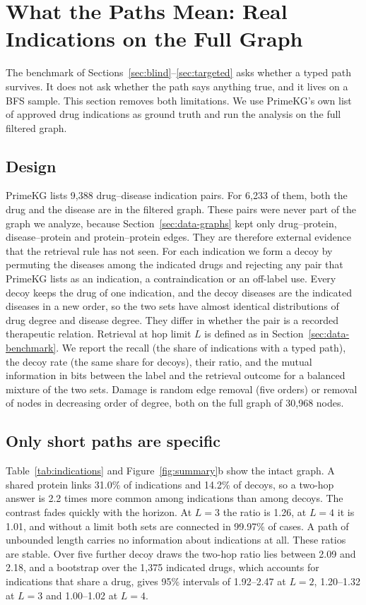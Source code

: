 \section{What the Paths Mean: Real Indications on the Full Graph}
\label{sec:indications}

The benchmark of Sections~\ref{sec:blind}--\ref{sec:targeted} asks whether a
typed path survives. It does not ask whether the path says anything true, and
it lives on a BFS sample. This section removes both limitations. We use
PrimeKG's own list of approved drug indications as ground truth and run the
analysis on the full filtered graph.

\subsection{Design}
\label{sec:indications-design}

PrimeKG lists 9,388 drug--disease indication pairs. For 6,233 of them, both the
drug and the disease are in the filtered graph. These pairs were never part of
the graph we analyze, because Section~\ref{sec:data-graphs} kept only
drug--protein, disease--protein and protein--protein edges. They are therefore
external evidence that the retrieval rule has not seen. For each indication we
form a decoy by permuting the diseases among the indicated drugs and rejecting
any pair that PrimeKG lists as an indication, a contraindication or an
off-label use. Every decoy keeps the drug of one indication, and the decoy diseases
are the indicated diseases in a new order, so the two sets have almost
identical distributions of drug degree and disease degree. They differ in
whether the pair is a recorded therapeutic relation. Retrieval at hop limit $L$ is defined as in
Section~\ref{sec:data-benchmark}. We report the recall (the share of
indications with a typed path), the decoy rate (the same share for decoys),
their ratio, and the mutual information in bits between the label and the
retrieval outcome for a balanced mixture of the two sets. Damage is random edge
removal (five orders) or removal of nodes in decreasing order of degree, both on
the full graph of 30,968 nodes.

\subsection{Only short paths are specific}
\label{sec:indications-specific}

Table~\ref{tab:indications} and Figure~\ref{fig:summary}b show the intact
graph. A shared protein links 31.0\% of indications and 14.2\% of decoys, so a
two-hop answer is 2.2 times more common among indications than among decoys. The
contrast fades quickly with the horizon. At $L=3$ the ratio is 1.26, at $L=4$
it is 1.01, and without a limit both sets are connected in 99.97\% of cases. A
path of unbounded length carries no information about indications at all. These
ratios are stable. Over five further decoy draws the two-hop ratio lies between
2.09 and 2.18, and a bootstrap over the 1,375 indicated drugs, which accounts for
indications that share a drug, gives 95\% intervals of 1.92--2.47 at $L=2$,
1.20--1.32 at $L=3$ and 1.00--1.02 at $L=4$.

